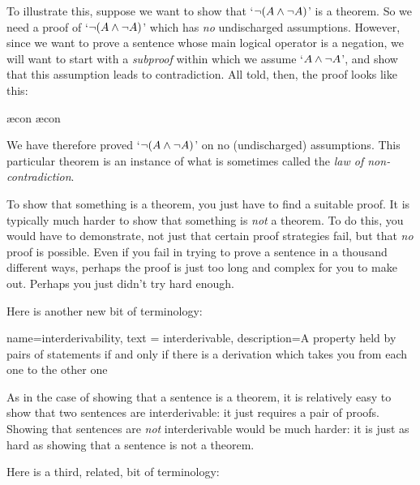 To illustrate this, suppose we want to show that `$\neg (A \wedge \neg A)$' is a theorem.  So we need a proof of `$\neg(A \wedge \neg A)$' which has \emph{no} undischarged assumptions. However, since we want to prove a sentence whose main logical operator is a negation, we will want to start with a \emph{subproof} within which we assume `$A \wedge \neg A$', and show that this assumption leads to contradiction. All told, then, the proof looks like this:
	\begin{fitchproof}
		\open
			\AS
			\ae{con}
			\ae{con}
		\close
	\end{fitchproof}
We have therefore proved `$\neg (A \wedge \neg A)$' on no
(undischarged) assumptions. This particular theorem is an instance of
what is sometimes called the \emph{law of non-contradiction}.

To show that something is a theorem, you just have to find a suitable proof. It is typically much harder to show that something is \emph{not} a theorem. To do this, you would have to demonstrate, not just that certain proof strategies fail, but that \emph{no} proof is possible. Even if you fail in trying to prove a sentence in a thousand different ways, perhaps the proof is just too long and complex for you to make out. Perhaps you just didn't try hard enough.

Here is another new bit of terminology:
        
{
  name=interderivability,
  text = interderivable,
description={A property held by pairs of statements if and only if there is a derivation which takes you from each one to the other one}
}


As in the case of showing that a sentence is a theorem, it is relatively easy to show that two sentences are interderivable: it just requires a pair of proofs. Showing that sentences are \emph{not} interderivable would be much harder: it is just as hard as showing that a sentence is not a theorem.

Here is a third, related, bit of terminology:
        

